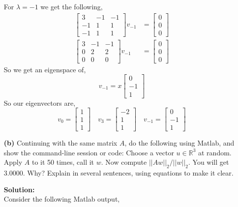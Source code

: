 \documentclass[12pt]{article}
\makeatletter
\theoremstyle{homework}
\newenvironment{exercise}[1]
{\def\@currentlabel{#1}\exercisecore}
{\endexercisecore}
\newcommand{\localhead}[1]{\par\smallskip\noindent\textbf{#1}\nobreak\\}%
\newcommand\solution{\localhead{Solution:}}
\newcommand{\Reals}{\ensuremath{\mathbb R}}
\let\RR\Reals
\makeatother
\begin{document}
\begin{exercise}{Problem P22}
\begin{enumerate}
For $\lambda = -1$ we get the following, 
\begin{align*}
  \begin{bmatrix}
    3 & -1 & -1\\
    -1& 1 & 1\\
    -1 & 1 & 1
  \end{bmatrix}v_{-1} &=
  \begin{bmatrix}
    0\\
    0\\
    0
  \end{bmatrix}\\
  \begin{bmatrix}
    3 & -1 & -1\\
    0& 2 & 2\\
    0 & 0 & 0
  \end{bmatrix}v_{-1} &=
  \begin{bmatrix}
    0\\
    0\\
    0
  \end{bmatrix}
\end{align*}
So we get an eigenspace of, 
\begin{equation*}
  v_{-1} = x\begin{bmatrix}
    0\\
    -1\\
    1
  \end{bmatrix}
\end{equation*}
So our eigenvectors are, 
\begin{equation*}
  v_0 = \begin{bmatrix}
    1\\
    1\\
    1
  \end{bmatrix} \quad
  v_3 = \begin{bmatrix}
    -2\\
    1\\
    1
  \end{bmatrix} \quad
  v_{-1} = \begin{bmatrix}
    0\\
    -1\\
    1
  \end{bmatrix}
\end{equation*}
\vspace{.15in}

\item[\textbf{(b)}] Continuing with the same matrix $A$, do the following using Matlab, and 
show the command-line session or code: Choose a vector $u \in \RR^3$ at random. Apply $A$ to it 
50 times, call it $w$. Now compute $||Aw||_2/||w||_2$. You will get 3.0000. Why? Explain in several sentences, 
using equations to make it clear.   
\solution Consider the following Matlab output,\\


\end{enumerate}
\end{exercise}
\end{document}
